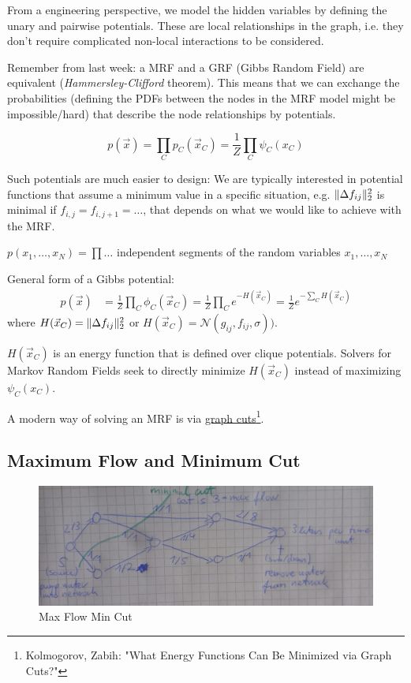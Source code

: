 \documentclass{scrartcl}
\DeclarePairedDelimiter\norm{\lVert}{\rVert}%
\begin{document}
From a engineering perspective, we model the hidden variables by defining the unary and pairwise potentials. These are local relationships in the graph, i.e. they don't require complicated non-local interactions to be considered.

Remember from last week: a MRF and a GRF (Gibbs Random Field) are equivalent (\textit{Hammersley-Clifford} theorem).
This means that we can exchange the probabilities (defining the PDFs between the nodes in the MRF model might be impossible/hard) that describe the node relationships by potentials.

\[p(\vec{x}) = \prod_C p_C(\vec{x}_C) = \frac{1}{Z} \prod_C \psi_C(x_C)\]

Such potentials are much easier to design: We are typically interested in potential functions that assume a minimum value in a specific situation, e.g. \(\norm{\Delta f_{ij}}_2^2\) is minimal if \(f_{i,j} = f_{i,j+1} = \dots\), that depends on what we would like to achieve with the MRF.

\(p(x_1, \dots, x_N) = \prod \dots\) independent segments of the random variables \(x_1, \dots, x_N\)

General form of a Gibbs potential:
\begin{align*}
    p(\vec{x}) &= \frac{1}{Z} \prod_C \phi_C (\vec{x}_C)
    = \frac{1}{Z} \prod_C e^{-H(\vec{x}_C)}
    = \frac{1}{Z} e^{- \sum_C H(\vec{x}_C)}
\end{align*}
where \(H(\vec{x}_C) = \norm{\Delta f_{ij}}_2^2\) or \(H(\vec{x}_C) = \mathcal{N}(g_{ij}, f_{ij}, \sigma))\).

\bigskip

\(H(\vec{x}_C)\) is an energy function that is defined over clique potentials. Solvers for Markov Random Fields seek to directly minimize \(H(\vec{x}_C)\) instead of maximizing \(\psi_C(x_C)\).

A modern way of solving an MRF is via \underline{graph cuts}\footnote{ Kolmogorov, Zabih: "What Energy Functions Can Be Minimized via Graph Cuts?"}.

\subsection{Maximum Flow and Minimum Cut}
\begin{figure}[ht]
	\centering
    \includegraphics[scale=0.13]{img/mrf_2.jpg}
	\caption{Max Flow Min Cut}
	\label{fig:mrf_2}
\end{figure}
\end{document}

